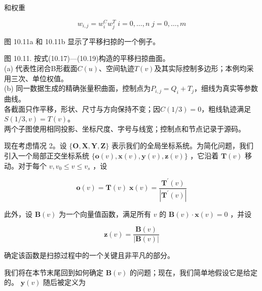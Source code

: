 \documentclass[../main.tex]{subfiles}
\begin{document}
和权重

\[
{w}_{i,j} = {w}_{i}^{C}{w}_{j}^{T}\;i = 0,\ldots ,n\;j = 0,\ldots ,m \tag{10.19}
\]

图 10.11a 和 10.11b 显示了平移扫掠的一个例子。

\begin{center}
\begin{minipage}{35cm}
\vspace*{.6\baselineskip}
\centering
{}\hspace{1cm}
\par\smallskip
图 10.11. 按式(10.17)—(10.19)构造的平移扫掠曲面。\\
(a) 代表性闭合B形截面$C(u)$、空间轨迹$T(v)$及其实际控制多边形；本例均采用三次、单位权值。\\
(b) 同一数据生成的精确张量积曲面，控制点为$P_{i,j}=Q_i+T_j$，细线为真实等参数曲线。\\
各截面只作平移，形状、尺寸与方向保持不变；因$C(1/3)=0$，粗线轨迹满足$S(1/3,v)=T(v)$。\\
两个子图使用相同投影、坐标尺度、字号与线宽；控制点和节点记录于源码。
\end{minipage}
\end{center}

现在考虑情况 2。设 \(\{ \mathbf{O},\mathbf{X},\mathbf{Y},\mathbf{Z}\}\) 表示我们的全局坐标系统。为简化问题，我们引入一个局部正交坐标系统 \(\{ \mathbf{o}\left( v\right) ,\mathbf{x}\left( v\right) ,\mathbf{y}\left( v\right) ,\mathbf{z}\left( v\right) \}\) ，它沿着 \(\mathbf{T}\left( v\right)\) 移动。对于每个 \(v,{v}_{0} \leq  v \leq  {v}_{s}\) ，设

\[
\mathbf{o}\left( v\right)  = \mathbf{T}\left( v\right) \;\mathbf{x}\left( v\right)  = \frac{{\mathbf{T}}^{\prime }\left( v\right) }{\left| {\mathbf{T}}^{\prime }\left( v\right) \right| } \tag{10.20}
\]

此外，设 \(\mathbf{B}\left( v\right)\) 为一个向量值函数，满足所有 \(v\) 的 \(\mathbf{B}\left( v\right)  \cdot  \mathbf{x}\left( v\right)  = 0\) ，并设

\[
\mathbf{z}\left( v\right)  = \frac{\mathbf{B}\left( v\right) }{\left| \mathbf{B}\left( v\right) \right| } \tag{10.21}
\]

确定该函数是扫掠过程中的一个关键且非平凡的部分。







我们将在本节末尾回到如何确定 \(\mathbf{B}\left( v\right)\) 的问题；现在，我们简单地假设它是给定的。 \(\mathbf{y}\left( v\right)\) 随后被定义为
\end{document}
